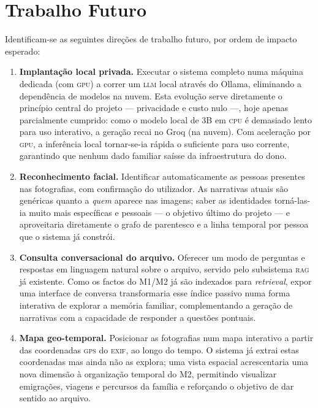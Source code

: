 \section{Trabalho Futuro}
\label{sec:trabalho_futuro}

Identificam-se as seguintes direções de trabalho futuro, por ordem de
impacto esperado:

\begin{enumerate}[leftmargin=*]
  \item \textbf{Implantação local privada.} Executar o sistema completo numa
  máquina dedicada (com \textsc{gpu}) a correr um \textsc{llm} local através do
  Ollama, eliminando a dependência de modelos na nuvem. Esta evolução serve
  diretamente o princípio central do projeto --- privacidade e custo nulo ---,
  hoje apenas parcialmente cumprido: como o modelo local de 3B em \textsc{cpu}
  é demasiado lento para uso interativo, a geração recai no Groq (na nuvem).
  Com aceleração por \textsc{gpu}, a inferência local tornar-se-ia rápida o
  suficiente para uso corrente, garantindo que nenhum dado familiar saísse da
  infraestrutura do dono.

  \item \textbf{Reconhecimento facial.} Identificar automaticamente as
  pessoas presentes nas fotografias, com confirmação do utilizador. As
  narrativas atuais são genéricas quanto a \emph{quem} aparece nas imagens;
  saber as identidades torná-las-ia muito mais específicas e pessoais ---
  o objetivo último do projeto --- e aproveitaria diretamente o grafo de
  parentesco e a linha temporal por pessoa que o sistema já constrói.

  \item \textbf{Consulta conversacional do arquivo.} Oferecer um modo de
  perguntas e respostas em linguagem natural sobre o arquivo, servido pelo
  subsistema \textsc{rag} já existente. Como os factos do M1/M2 já são
  indexados para \emph{retrieval}, expor uma interface de conversa
  transformaria esse índice passivo numa forma interativa de explorar a
  memória familiar, complementando a geração de narrativas com a capacidade de
  responder a questões pontuais.

  \item \textbf{Mapa geo-temporal.} Posicionar as fotografias num mapa
  interativo a partir das coordenadas \textsc{gps} do \textsc{exif}, ao longo
  do tempo. O sistema já extrai estas coordenadas mas ainda não as explora;
  uma vista espacial acrescentaria uma nova dimensão à organização temporal do
  M2, permitindo visualizar emigrações, viagens e percursos da família e
  reforçando o objetivo de dar sentido ao arquivo.


\end{enumerate}
